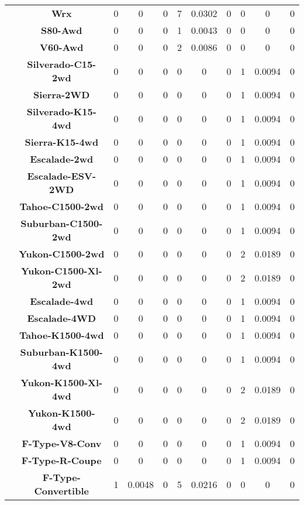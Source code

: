 \begin{center}
\begin{tabular}{|c|c||@{\hspace{1ex}}||c|c|c||@{\hspace{1ex}}||c|c|c||@{\hspace{1ex}}||c|c|c||@{\hspace{1ex}}||}
\cline{2-11}
  & {\bf Wrx} & 0 & 0 & 0 & 7 & 0.0302 & 0 & 0 & 0 & 0 \\
\cline{2-11}
  & {\bf S80-Awd} & 0 & 0 & 0 & 1 & 0.0043 & 0 & 0 & 0 & 0 \\
\cline{2-11}
  & {\bf V60-Awd} & 0 & 0 & 0 & 2 & 0.0086 & 0 & 0 & 0 & 0 \\
\cline{2-11}
  & {\bf Silverado-C15-2wd} & 0 & 0 & 0 & 0 & 0 & 0 & 1 & 0.0094 & 0 \\
\cline{2-11}
  & {\bf Sierra-2WD} & 0 & 0 & 0 & 0 & 0 & 0 & 1 & 0.0094 & 0 \\
\cline{2-11}
  & {\bf Silverado-K15-4wd} & 0 & 0 & 0 & 0 & 0 & 0 & 1 & 0.0094 & 0 \\
\cline{2-11}
  & {\bf Sierra-K15-4wd} & 0 & 0 & 0 & 0 & 0 & 0 & 1 & 0.0094 & 0 \\
\cline{2-11}
  & {\bf Escalade-2wd} & 0 & 0 & 0 & 0 & 0 & 0 & 1 & 0.0094 & 0 \\
\cline{2-11}
  & {\bf Escalade-ESV-2WD} & 0 & 0 & 0 & 0 & 0 & 0 & 1 & 0.0094 & 0 \\
\cline{2-11}
  & {\bf Tahoe-C1500-2wd} & 0 & 0 & 0 & 0 & 0 & 0 & 1 & 0.0094 & 0 \\
\cline{2-11}
  & {\bf Suburban-C1500-2wd} & 0 & 0 & 0 & 0 & 0 & 0 & 1 & 0.0094 & 0 \\
\cline{2-11}
  & {\bf Yukon-C1500-2wd} & 0 & 0 & 0 & 0 & 0 & 0 & 2 & 0.0189 & 0 \\
\cline{2-11}
  & {\bf Yukon-C1500-Xl-2wd} & 0 & 0 & 0 & 0 & 0 & 0 & 2 & 0.0189 & 0 \\
\cline{2-11}
  & {\bf Escalade-4wd} & 0 & 0 & 0 & 0 & 0 & 0 & 1 & 0.0094 & 0 \\
\cline{2-11}
  & {\bf Escalade-4WD} & 0 & 0 & 0 & 0 & 0 & 0 & 1 & 0.0094 & 0 \\
\cline{2-11}
  & {\bf Tahoe-K1500-4wd} & 0 & 0 & 0 & 0 & 0 & 0 & 1 & 0.0094 & 0 \\
\cline{2-11}
  & {\bf Suburban-K1500-4wd} & 0 & 0 & 0 & 0 & 0 & 0 & 1 & 0.0094 & 0 \\
\cline{2-11}
  & {\bf Yukon-K1500-Xl-4wd} & 0 & 0 & 0 & 0 & 0 & 0 & 2 & 0.0189 & 0 \\
\cline{2-11}
  & {\bf Yukon-K1500-4wd} & 0 & 0 & 0 & 0 & 0 & 0 & 2 & 0.0189 & 0 \\
\cline{2-11}
  & {\bf F-Type-V8-Conv} & 0 & 0 & 0 & 0 & 0 & 0 & 1 & 0.0094 & 0 \\
\cline{2-11}
  & {\bf F-Type-R-Coupe} & 0 & 0 & 0 & 0 & 0 & 0 & 1 & 0.0094 & 0 \\
\cline{2-11}
  & {\bf F-Type-Convertible} & 1 & 0.0048 & 0 & 5 & 0.0216 & 0 & 0 & 0 & 0 \\

\end{tabular}
\end{center}
